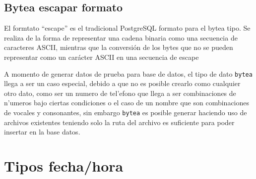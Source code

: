 \subsection{Bytea escapar formato}
El formtato ``escape'' es el tradicional PostgreSQL formato para el bytea tipo. Se realiza de la forma de representar una cadena binaria como una secuencia de caracteres ASCII, mientras que la conversi\'on de los bytes que no se pueden representar como un car\'acter ASCII en una secuencia de escape

A momento de generar datos de prueba para base de datos, el tipo de dato \texttt{bytea} llega a ser un caso especial, debido a que no es posible crearlo como cualquier otro dato, como ser un numero de tel'efono que llega a ser combinaciones de n'umeros bajo ciertas condiciones o el caso de un nombre que son combinaciones de vocales y consonantes, sin embargo \texttt{bytea} es posible generar haciendo uso de archivos existentes teniendo solo la ruta del archivo es suficiente para poder insertar en la base datos.
\section{Tipos fecha/hora}
